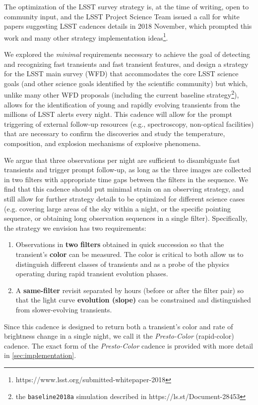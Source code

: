 \documentclass[letterpaper,longauthor,trackchanges,twocolumn,onecolappendix,sort&compress]{aastex62}
\begin{document}
The optimization of the LSST survey strategy is, at the time of writing, open to community input, and the LSST Project Science Team issued a call for white papers suggesting LSST cadences details in 2018 November, which prompted this work and many other strategy implementation ideas\footnote{https://www.lsst.org/submitted-whitepaper-2018}. 

We explored the \emph{minimal} requirements necessary to achieve the goal of detecting and recognizing fast transients and fast transient features, and design a strategy for the LSST main survey (WFD) that accommodates the core LSST science goals (and other science goals identified by the scientific community) but which, unlike many other WFD proposals (including the current baseline strategy\footnote{the {\tt baseline2018a} simulation described in https://ls.st/Document-28453}), allows for the identification of young and rapidly evolving transients from the millions of LSST alerts every night. This cadence will allow for the prompt triggering of external follow-up resources (e.g., spectroscopy, non-optical facilities) that are necessary to confirm the discoveries and study the temperature, composition, and explosion mechanisms of explosive phenomena.

We argue that three observations per night are sufficient to disambiguate fast transients and trigger prompt follow-up, as long as the three images are collected in two filters with appropriate time gaps between the filters in the sequence. We find that this cadence should put minimal strain on an observing strategy, and still allow for further strategy details to be optimized for different science cases (e.g. covering large areas of the sky within a night, or the specific pointing sequence, or obtaining long observation sequences in a single filter). Specifically, the strategy we envision has two requirements: 
\begin{enumerate}
    \item Observations in {\bf two filters} obtained in quick succession so that the transient's {\bf color} can be measured. The color is critical to both allow us to distinguish different classes of transients and as a probe of the physics operating during rapid transient evolution phases.
    \item A {\bf same-filter} revisit separated by hours (before or after the filter pair) so that the light curve {\bf evolution (slope)} can be constrained and distinguished from slower-evolving transients.
\end{enumerate}
Since this cadence is designed to return both a transient's color and rate of brightness change in a single night, we call it the {\em Presto-Color} (rapid-color) cadence. 
The exact form of the {\em Presto-Color} cadence is provided with more detail in \autoref{sec:implementation}.
\end{document}
